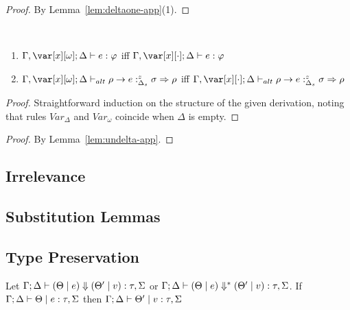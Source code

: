 \documentclass[acmsmall,review,screen]{acmart}
\begin{document}
\deltaone*
\begin{proof}
By Lemma~\ref{lem:deltaone-app}(1).
\end{proof}

\begin{lemma}~\label{lem:undelta-app}
  \begin{enumerate}
    \item $\G,\xo; \D \vdash e : \vp$ iff $\G,\x[\cdot]; \D \vdash e :
      \vp$
    \item $\G,\xo;\D \vdash_{alt} \rho \rightarrow e
      :^z_{\Delta_s} \sigma \Rightarrow \rho$ iff
      $\G,\x[\cdot];\D \vdash_{alt} \rho \rightarrow e
   :^z_{\Delta_s} \sigma \Rightarrow \rho$
  \end{enumerate}
\end{lemma}
\begin{proof}
Straightforward induction on the structure of the given derivation,
noting that rules $\mathit{Var}_\Delta$ and $\mathit{Var}_\omega$
coincide when $\Delta$ is empty.
\end{proof}

\undelta*

\begin{proof}
By Lemma~\ref{lem:undelta-app}.
\end{proof}


\subsection{Irrelevance\label{sec:proof:irrelevance}}



\subsection{Substitution Lemmas\label{sec:proof:substitution-lemmas}}









\subsection{Type Preservation\label{sec:proof:type-preservation}}

% 
\begin{theorem}\label{thm:typepres}
  Let $\Gamma ; \Delta \vdash (\Theta \mid e) \Downarrow (\Theta' \mid v) :
  \tau , \Sigma$ or $\Gamma ; \Delta \vdash (\Theta \mid e) \Downarrow^* (\Theta' \mid v) :
  \tau , \Sigma$.
  If $\Gamma ; \Delta \vdash \Theta \mid e : \tau , \Sigma$ then $\Gamma ; \Delta \vdash \Theta' \mid v : \tau , \Sigma$
  
\end{theorem}
\end{document}
